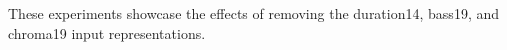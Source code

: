 
These experiments showcase the effects of removing the
\gls{duration14}, \gls{bass19}, and \gls{chroma19} input
representations.

